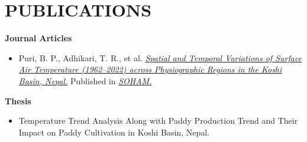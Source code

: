\documentclass[a4paper, 11pt]{extarticle}
\begin{document}
\section*{PUBLICATIONS}
\noindent
\textbf{Journal Articles}
\begin{itemize}
    \item Puri, B. P., Adhikari, T. R., et al. \href{https://doi.org/10.3126/jhm.v12i1.72654}{\textit{Spatial and Temporal Variations of Surface Air Temperature (1962–2022) across Physiographic Regions in the Koshi Basin, Nepal.}} Published in \href{https://soham.org.np/}{\textit{SOHAM.}}  
\end{itemize}

\noindent
\textbf{Thesis}
\begin{itemize}
    \item Temperature Trend Analysis Along with Paddy Production Trend and Their Impact on Paddy Cultivation in Koshi Basin, Nepal.

\end{itemize}
\end{document}
